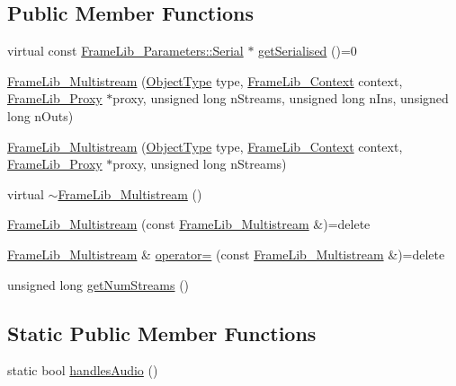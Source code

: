 \subsection*{Public Member Functions}
\begin{DoxyCompactItemize}
\item 
virtual const \hyperlink{class_frame_lib___parameters_1_1_serial}{Frame\+Lib\+\_\+\+Parameters\+::\+Serial} $\ast$ \hyperlink{class_frame_lib___multistream_a881e38e7846d7cc68c49b86b7c839072}{get\+Serialised} ()=0
\item 
\hyperlink{class_frame_lib___multistream_afcaf1841d86c9fe33c88770b504e3f5f}{Frame\+Lib\+\_\+\+Multistream} (\hyperlink{_frame_lib___types_8h_a842c5e2e69277690b064bf363c017980}{Object\+Type} type, \hyperlink{class_frame_lib___context}{Frame\+Lib\+\_\+\+Context} context, \hyperlink{struct_frame_lib___proxy}{Frame\+Lib\+\_\+\+Proxy} $\ast$proxy, unsigned long n\+Streams, unsigned long n\+Ins, unsigned long n\+Outs)
\item 
\hyperlink{class_frame_lib___multistream_afdbbf88bf219b9bd70cfb9af370f35b9}{Frame\+Lib\+\_\+\+Multistream} (\hyperlink{_frame_lib___types_8h_a842c5e2e69277690b064bf363c017980}{Object\+Type} type, \hyperlink{class_frame_lib___context}{Frame\+Lib\+\_\+\+Context} context, \hyperlink{struct_frame_lib___proxy}{Frame\+Lib\+\_\+\+Proxy} $\ast$proxy, unsigned long n\+Streams)
\item 
virtual \hyperlink{class_frame_lib___multistream_aec5b5f839e1ac9587fbbccb2b4aa9f41}{$\sim$\+Frame\+Lib\+\_\+\+Multistream} ()
\item 
\hyperlink{class_frame_lib___multistream_a14ad6638239b41826f3c1528fb7c9b09}{Frame\+Lib\+\_\+\+Multistream} (const \hyperlink{class_frame_lib___multistream}{Frame\+Lib\+\_\+\+Multistream} \&)=delete
\item 
\hyperlink{class_frame_lib___multistream}{Frame\+Lib\+\_\+\+Multistream} \& \hyperlink{class_frame_lib___multistream_a7f6e0b81b8789a5704224660265b4a51}{operator=} (const \hyperlink{class_frame_lib___multistream}{Frame\+Lib\+\_\+\+Multistream} \&)=delete
\item 
unsigned long \hyperlink{class_frame_lib___multistream_adca964e3fa45b2f0c9eb9f902361df13}{get\+Num\+Streams} ()
\end{DoxyCompactItemize}
\subsection*{Static Public Member Functions}
\begin{DoxyCompactItemize}
\item 
static bool \hyperlink{class_frame_lib___multistream_a9e43977822d8e46d46e185452cdbd819}{handles\+Audio} ()
\end{DoxyCompactItemize}
